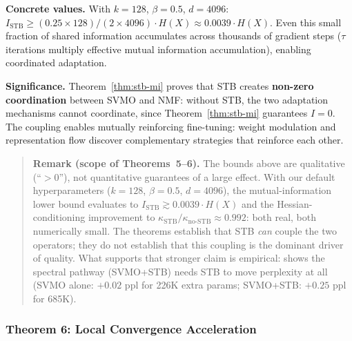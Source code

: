 \documentclass{scpe}
\begin{document}
\textbf{Concrete values.} With $k = 128$, $\beta = 0.5$, $d = 4096$: $I_{\text{STB}} \geq (0.25 \times 128)/(2 \times 4096) \cdot H(X) \approx 0.0039 \cdot H(X)$. Even this small fraction of shared information accumulates across thousands of gradient steps ($\tau$ iterations multiply effective mutual information accumulation), enabling coordinated adaptation.

\textbf{Significance.} Theorem~\ref{thm:stb-mi} proves that STB creates \textbf{non-zero coordination} between SVMO and NMF: without STB, the two adaptation mechanisms cannot coordinate, since Theorem~\ref{thm:stb-mi} guarantees $I = 0$. The coupling enables mutually reinforcing fine-tuning: weight modulation and representation flow discover complementary strategies that reinforce each other.

\begin{quote}
\small
\textbf{Remark (scope of Theorems~5--6).} The bounds above are qualitative (``$>0$''), not quantitative guarantees of a large effect. With our default hyperparameters ($k{=}128$, $\beta{=}0.5$, $d{=}4096$), the mutual-information lower bound evaluates to $I_{\mathrm{STB}} \gtrsim 0.0039 \cdot H(X)$ and the Hessian-conditioning improvement to $\kappa_{\mathrm{STB}}/\kappa_{\mathrm{no\text{-}STB}} \approx 0.992$: both real, both numerically small. The theorems establish that STB \emph{can} couple the two operators; they do not establish that this coupling is the dominant driver of quality. What supports that stronger claim is empirical:  shows the spectral pathway (SVMO+STB) needs STB to move perplexity at all (SVMO alone: $+0.02$ ppl for 226K extra params; SVMO+STB: $+0.25$ ppl for 685K).
\end{quote}

\subsubsection{Theorem 6: Local Convergence Acceleration}
\end{document}
